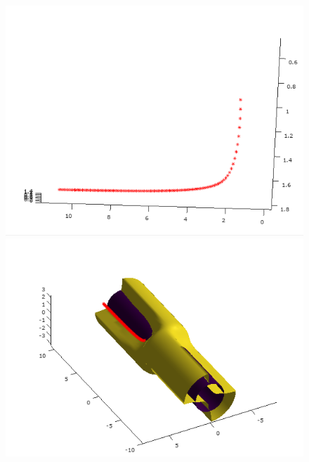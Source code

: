 \documentclass[12pt]{article}
\begin{document}
\begin{minipage}{\textwidth}
\begin{figure}[H]
    	\includegraphics[scale=0.4]{primer5_3}
    	\includegraphics[scale=0.4]{primer5_4} 
	\end{figure}
	\end{minipage}
	
\end{document}
